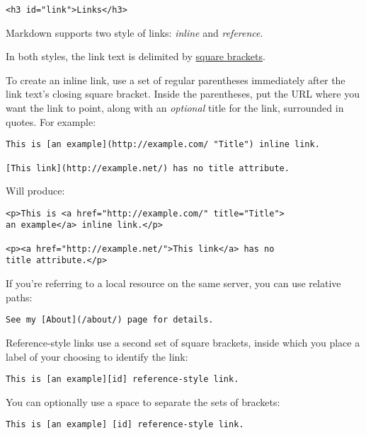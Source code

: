 \begin{lstlisting}<h3 id="link">Links</h3>\end{lstlisting}




Markdown supports two style of links: \emph{inline} and \emph{reference}.



In both styles, the link text is delimited by \href{}{square brackets}.



To create an inline link, use a set of regular parentheses immediately
after the link text's closing square bracket. Inside the parentheses,
put the URL where you want the link to point, along with an \emph{optional}
title for the link, surrounded in quotes. For example:

\begin{lstlisting}
This is [an example](http://example.com/ "Title") inline link.

[This link](http://example.net/) has no title attribute.
\end{lstlisting}




Will produce:

\begin{lstlisting}
<p>This is <a href="http://example.com/" title="Title">
an example</a> inline link.</p>

<p><a href="http://example.net/">This link</a> has no
title attribute.</p>
\end{lstlisting}




If you're referring to a local resource on the same server, you can
use relative paths:

\begin{lstlisting}
See my [About](/about/) page for details.
\end{lstlisting}




Reference-style links use a second set of square brackets, inside
which you place a label of your choosing to identify the link:

\begin{lstlisting}
This is [an example][id] reference-style link.
\end{lstlisting}




You can optionally use a space to separate the sets of brackets:

\begin{lstlisting}
This is [an example] [id] reference-style link.
\end{lstlisting}




